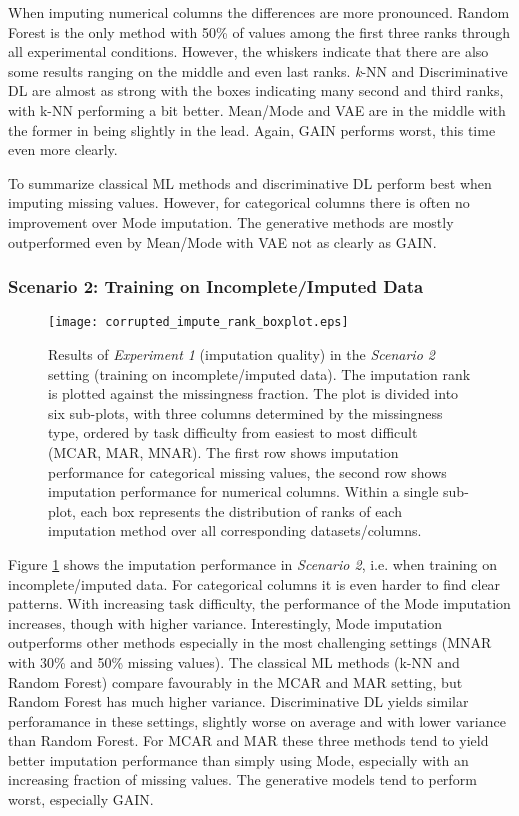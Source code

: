 When imputing numerical columns the differences are more pronounced. Random Forest is the only method with 50\% of values among the first three ranks through all experimental conditions. However, the whiskers indicate that there are also some results ranging on the middle and even last ranks. \textit{k}-NN and Discriminative DL are almost as strong with the boxes indicating many second and third ranks, with k-NN performing a bit better. Mean/Mode and VAE are in the middle with the former in being slightly in the lead. Again, GAIN performs worst, this time even more clearly.

To summarize classical ML methods and discriminative DL perform best when imputing missing values. However, for categorical columns there is often no improvement over Mode imputation. The generative methods are mostly outperformed even by Mean/Mode with VAE not as clearly as GAIN.


\subsubsection{Scenario 2: Training on Incomplete/Imputed Data}


\begin{figure}\centering
    \texttt{[image: corrupted\_impute\_rank\_boxplot.eps]}

    \caption[Imputation Ranks - Corrupted]{Results of \textit{Experiment 1} (imputation quality) in the \textit{Scenario 2} setting (training on incomplete/imputed data). The imputation rank is plotted against the missingness fraction. The plot is divided into six sub-plots, with three columns determined by the missingness type, ordered by task difficulty from easiest to most difficult (MCAR, MAR, MNAR). The first row shows imputation performance for categorical missing values,  the second row shows imputation performance for numerical columns. Within a single sub-plot, each box represents the distribution of ranks of each imputation method over all corresponding datasets/columns.
    }
	\label{fig:corrupted_impute_rank_boxplot}
\end{figure}

Figure \ref{fig:corrupted_impute_rank_boxplot} shows the imputation performance in \textit{Scenario 2}, i.e. when training on incomplete/imputed data. For categorical columns it is even harder to find clear patterns. With increasing task difficulty, the performance of the Mode imputation increases, though with higher variance. Interestingly, Mode imputation outperforms other methods especially in the most challenging settings (MNAR with 30\% and 50\% missing values). The classical ML methods (k-NN and Random Forest) compare favourably in the MCAR and MAR setting, but Random Forest has much higher variance. Discriminative DL yields similar perforamance in these settings, slightly worse on average and with lower variance than Random Forest. For MCAR and MAR these three methods tend to yield better imputation performance than simply using Mode, especially with an increasing fraction of missing values. The generative models tend to perform worst, especially GAIN.

